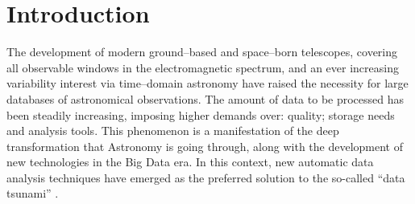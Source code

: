 \documentclass[final,5p,times,twocolumn,authoryear]{elsarticle}
\begin{document}
\section{Introduction}
\label{section:intro}

The development of modern ground--based and space--born telescopes, covering
all observable windows in the electromagnetic spectrum, and an ever increasing
variability interest via time--domain astronomy have raised the necessity for
large databases of astronomical observations.
%
The amount of data to be processed has been steadily increasing,
imposing higher demands over: quality; storage needs and analysis
tools.
%
This phenomenon is a manifestation of the deep transformation that Astronomy is going through,
along with the development of new technologies in the Big Data era.
%
In this context,
new automatic data analysis techniques have emerged as the preferred solution
to the so-called ``data tsunami'' \citep{cavuoti_data-rich_2013}.
\end{document}
